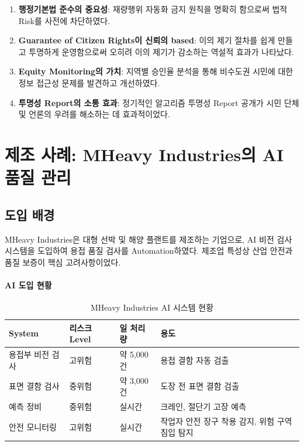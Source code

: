 \begin{enumerate}
 \item \textbf{행정기본법 준수의 중요성}: 
 재량행위 자동화 금지 원칙을 명확히 함으로써 법적 Risk를 사전에 차단하였다.
 
 \item \textbf{Guarantee of Citizen Rights이 신뢰의 based}: 
 이의 제기 절차를 쉽게 만들고 투명하게 운영함으로써 
 오히려 이의 제기가 감소하는 역설적 효과가 나타났다.
 
 \item \textbf{Equity Monitoring의 가치}: 
 지역별 승인율 분석을 통해 비수도권 시민에 대한 
 정보 접근성 문제를 발견하고 개선하였다.
 
 \item \textbf{투명성 Report의 소통 효과}: 
 정기적인 알고리즘 투명성 Report 공개가 
 시민 단체 및 언론의 우려를 해소하는 데 효과적이었다.
\end{enumerate}

\section{제조 사례: MHeavy Industries의 AI 품질 관리}
\label{sec:7.4}

\subsection{도입 배경}
\label{sec:7.4.1}

MHeavy Industries은 대형 선박 및 해양 플랜트를 제조하는 기업으로, 
AI 비전 검사 시스템을 도입하여 용접 품질 검사를 Automation하였다. 
제조업 특성상 산업 안전과 품질 보증이 핵심 고려사항이었다.

\paragraph{AI 도입 현황}

\begin{table}[htbp]
\centering
\caption{MHeavy Industries AI 시스템 현황}
\label{tab:manufacturing_ai_inventory}
\begin{tabularx}{\textwidth}{p{3cm}p{2cm}p{2.5cm}X}
\toprule
\textbf{System} & \textbf{리스크 Level} & \textbf{일 처리량} & \textbf{용도} \\
\midrule
용접부 비전 검사 & 고위험 & 약 5,000건 & 용접 결함 자동 검출 \\
\midrule
표면 결함 검사 & 중위험 & 약 3,000건 & 도장 전 표면 결함 검출 \\
\midrule
예측 정비 & 중위험 & 실시간 & 크레인, 절단기 고장 예측 \\
\midrule
안전 모니터링 & 고위험 & 실시간 & 작업자 안전 장구 착용 감지, 위험 구역 침입 탐지 \\
\bottomrule
\end{tabularx}
\end{table}


